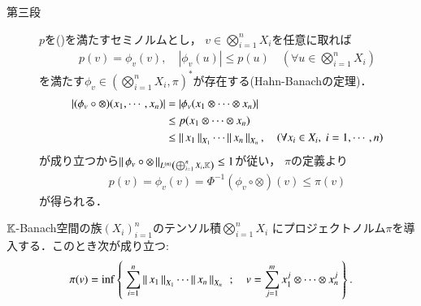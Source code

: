\begin{prf}
\begin{description}
			\item[第三段]
				$p$を()を満たすセミノルムとし，
				$v \in \bigotimes_{i=1}^n X_i$を任意に取れば
				\begin{align}
					p(v) = \phi_v(v),
					\quad |\phi_v(u)| \leq p(u)
					\quad (\forall u \in \bigotimes_{i=1}^n X_i)
				\end{align}
				を満たす$\phi_v \in (\bigotimes_{i=1}^n X_i,\pi)^*$が存在する(Hahn-Banachの定理)．
				\begin{align}
					\left| (\phi_v \circ \otimes)(x_1,\cdots,x_n) \right|
					&= \left|\phi_v(x_1 \otimes \cdots \otimes x_n)\right| \\ 
					&\leq p(x_1 \otimes \cdots \otimes x_n) \\
					&\leq \Norm{x_1}{X_1} \cdots \Norm{x_n}{X_n},
					\quad (\forall x_i \in X_i,\ i=1,\cdots,n)
				\end{align}
				が成り立つから$\Norm{\phi_v \circ \otimes}{\ContLn{\bigoplus_{i=1}^n X_i}{\K}{n}} \leq 1$が従い，
				$\pi$の定義より
				\begin{align}
					p(v) = \phi_v(v) = \Phi^{-1}(\phi_v \circ \otimes)(v)
					\leq \pi(v)
				\end{align}
				が得られる．
				\QED
		\end{description}
	\end{prf}
	
	\begin{screen}
		\begin{thm}[プロジェクティブノルムの表現]\label{thm:expression_of_projective_norm}
			$\K$-Banach空間の族$(X_i)_{i=1}^n$のテンソル積$\bigotimes_{i=1}^n X_i$
			にプロジェクトノルム$\pi$を導入する．このとき次が成り立つ:
			\begin{align}
				\pi(v) = \inf{}{\Set{\sum_{i=1}^n \Norm{x_1}{X_1} \cdots \Norm{x_n}{X_n}}{
					v = \sum_{j=1}^m x^j_1 \otimes \cdots \otimes x^j_n}}.
			\end{align}
		\end{thm}
	\end{screen}
	
